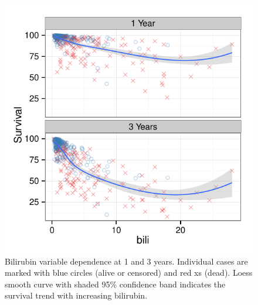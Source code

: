 \documentclass[nojss]{jss}\usepackage[]{graphicx}\usepackage[]{color}
\makeatletter
\def\maxwidth{ %
  \ifdim\Gin@nat@width>\linewidth
    \linewidth
  \else
    \Gin@nat@width
  \fi
}
\makeatother
\begin{document}
\begin{Schunk}
\begin{figure}[!htpb]

{\centering \includegraphics[width=\maxwidth]{figure/rfs-variable-plotbili-1} 

}

\caption[Bilirubin variable dependence at 1 and 3 years]{Bilirubin variable dependence at 1 and 3 years. Individual cases are marked with blue circles (alive or censored) and red xs (dead). Loess smooth curve with shaded 95\% confidence band indicates the survival trend with increasing bilirubin.\label{fig:variable-plotbili}}
\end{figure}
\end{Schunk}
\end{document}
